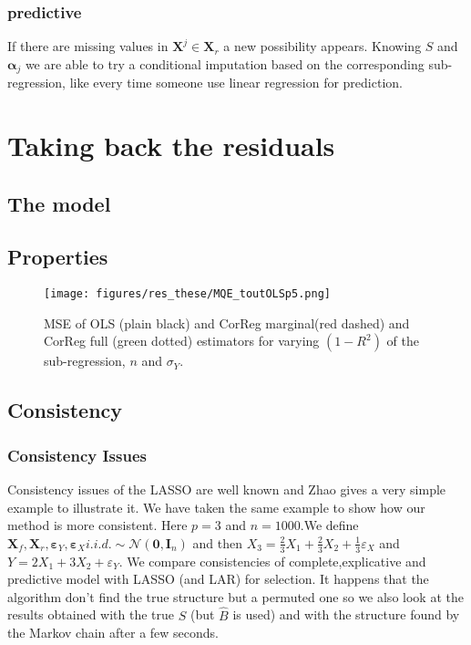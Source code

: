 \documentclass[11pt,a4paper]{report}
\begin{document}
		\subsection{predictive}
			If there are missing values in $\boldsymbol{X}^j \in \boldsymbol{X}_r$ a new possibility appears. Knowing $S$ and $\boldsymbol{\alpha}_j$ we are able to try a conditional imputation based on the corresponding sub-regression, like every time someone use linear regression for prediction. 

\chapter{Taking back the residuals}
	\section{The model}
	\section{Properties}
\begin{figure}[h!]
	\texttt{[image: figures/res\_these/MQE\_toutOLSp5.png]}\label{MQE2}
	\caption{MSE of OLS (plain black) and CorReg marginal(red dashed) and CorReg full (green dotted) estimators for varying $(1-R^2)$ of the sub-regression, $n$ and $\sigma_Y$.}
\end{figure}	
	
	\section{Consistency}
		\subsection{Consistency Issues}\label{consistency}
		Consistency issues of the LASSO are well known and Zhao \cite{Zhao2006MSC} gives a very simple example to illustrate it.
		We have taken the same example to show how our method is more consistent.
		Here $p=3$ and $n=1000$.We define $\boldsymbol{X}_f,\boldsymbol{X}_r,\boldsymbol{\varepsilon}_Y,\boldsymbol{\varepsilon}_{X} i.i.d. \sim \mathcal{N}(\boldsymbol{0},\boldsymbol{I}_n)$ and then $X_3=\frac{2}{3}X_1+\frac{2}{3}X_2+\frac{1}{3}\varepsilon_X$ and $Y=2X_1+3X_2+\varepsilon_Y$.
		We compare consistencies of complete,explicative and predictive model with LASSO (and LAR) for selection.
		It happens that the algorithm don't find the true structure but a permuted one so we also look at the results obtained with the true $S$ (but $\hat{B}$ is used) and with the structure found by the Markov chain after a few seconds.
		
\end{document}

